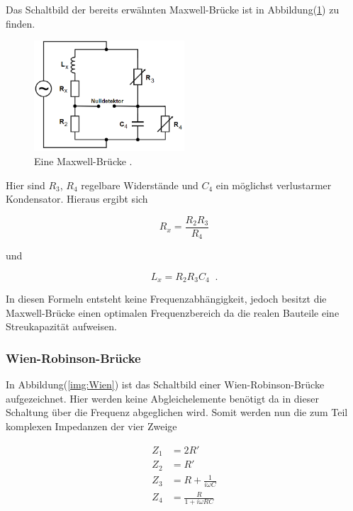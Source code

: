             \noindent Das Schaltbild der bereits erwähnten Maxwell-Brücke ist in Abbildung(\ref{img:Max}) zu finden.

            \begin{figure}[ht]
                \centering
                \includegraphics[width=0.5\textwidth]{latex/images/Maxwell.PNG}
                \caption{Eine Maxwell-Brücke \protect \cite{V302}.}
                \label{img:Max}
            \end{figure}

            \noindent Hier sind $R_3$, $R_4$ regelbare Widerstände und $C_4$ ein möglichst verlustarmer Kondensator.
            Hieraus ergibt sich 

            \begin{equation*}
                R_x = \frac{ R_2 R_3}{R_4}
            \end{equation*}

            \noindent und

            \begin{equation*}
                L_x = R_2 R_3 C_4 \; \; .
            \end{equation*}

            \noindent In diesen Formeln entsteht keine Frequenzabhängigkeit, jedoch besitzt die Maxwell-Brücke einen optimalen Frequenzbereich 
            da die realen Bauteile eine Streukapazität aufweisen. 

        \subsubsection{Wien-Robinson-Brücke}

            \noindent In Abbildung(\ref{img:Wien}) ist das Schaltbild einer Wien-Robinson-Brücke aufgezeichnet. Hier werden keine 
            Abgleichelemente benötigt da in dieser Schaltung über die Frequenz abgeglichen wird. Somit werden nun die zum Teil 
            komplexen Impedanzen der vier Zweige 

            \begin{align*}
                Z_1 &= 2R' \\
                Z_2 &= R'\\
                Z_3 &= R + \frac{1}{ i \omega C}\\
                Z_4 &= \frac{R}{1 + i \omega R C}
            \end{align*}

